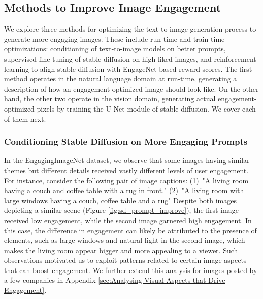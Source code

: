  
 
 
 
 
 
 

 \subsection{Methods to Improve Image Engagement}
 \label{sec:methods_to_improve_images}
 We explore three methods for optimizing the text-to-image generation process to generate more engaging images. These include run-time and train-time optimizations: conditioning of text-to-image models on better prompts, supervised fine-tuning of stable diffusion on high-liked images, and reinforcement learning to align stable diffusion with EngageNet-based reward scores. 
 The first method operates in the natural language domain at run-time, generating a description of how an engagement-optimized image should look like. On the other hand, the other two operate in the vision domain, generating actual engagement-optimized pixels by training the U-Net module of stable diffusion. We cover each of them next.
 
 

 
 
 \subsubsection{Conditioning Stable Diffusion on More Engaging Prompts}
 \label{sec:caption_improve}

In the EngagingImageNet dataset, we observe that some images having similar themes but different details received vastly different levels of user engagement. 
For instance, consider the following pair of image captions: 
(1)~"A living room having a couch and coffee table with a rug in front." 
(2)~"A living room with large windows having a couch, coffee table and a rug"
Despite both images depicting a similar scene (Figure \ref{fig:sd_prompt_improve}), the first image received low engagement, while the second image garnered high engagement. In this case, the difference in engagement can likely be attributed to the presence of elements, such as large windows and natural light in the second image, which makes the living room appear bigger and more appealing to a viewer. Such observations motivated us to exploit patterns related to certain image aspects that can boost engagement. We further extend this analysis for images posted by a few companies in Appendix \ref{sec:Analysing Visual Aspects that Drive Engagement}.
 
